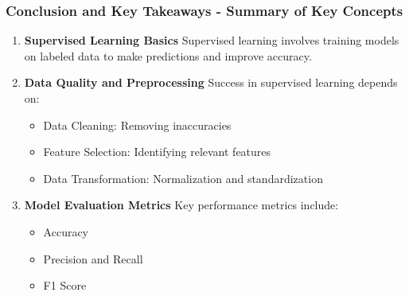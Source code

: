 \documentclass[aspectratio=169]{beamer}
\begin{document}
\begin{frame}[fragile]
    \frametitle{Conclusion and Key Takeaways - Summary of Key Concepts}
    
    \begin{enumerate}
        \item \textbf{Supervised Learning Basics}  
            Supervised learning involves training models on labeled data to make predictions and improve accuracy.
        
        \item \textbf{Data Quality and Preprocessing}  
            Success in supervised learning depends on:
            \begin{itemize}
                \item Data Cleaning: Removing inaccuracies
                \item Feature Selection: Identifying relevant features
                \item Data Transformation: Normalization and standardization
            \end{itemize}
        
        \item \textbf{Model Evaluation Metrics}  
            Key performance metrics include:
            \begin{itemize}
                \item Accuracy
                \item Precision and Recall
                \item F1 Score
            \end{itemize}
    \end{enumerate}
\end{frame}
\end{document}
